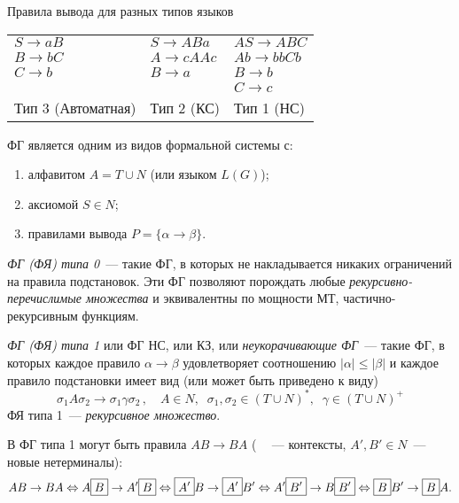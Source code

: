 \begin{ex}
  Правила вывода для разных типов языков
  \begin{center}
    \begin{tabular}[!hp]{p{11em}p{11em}p{8em}}
      $S \to aB$ & $S \to ABa$  & $AS \to ABC$ \\
      $B \to bC$ & $A \to cAAc$ & $Ab \to bbCb$\\
      $C \to b$  & $B \to a$    & $B  \to b$   \\
                 &              & $C  \to c$   \\[.5em]
      Тип 3 (Автоматная) & Тип 2 (КС) & Тип 1 (НС)\\
    \end{tabular}
  \end{center}
\end{ex}

\begin{rem}
  ФГ является одним из видов формальной системы с:
  \begin{enumerate}
  \item алфавитом $A = T \cup N$ (или языком $L(G)$);
  \item аксиомой $S \in N$;
  \item правилами вывода $P = \{\alpha \to \beta\}$.
  \end{enumerate}
\end{rem}

\begin{defin}
  \emph{ФГ (ФЯ) типа 0}~--- такие ФГ, в которых не накладывается
  никаких ограничений на правила подстановок. Эти ФГ позволяют
  порождать любые \emph{рекурсивно-перечислимые множества} и
  эквивалентны по мощности МТ, частично-рекурсивным функциям.
\end{defin}

\begin{defin}
  \emph{ФГ (ФЯ) типа 1} или ФГ НС, или КЗ, или \emph{неукорачивающие
    ФГ}~--- такие ФГ, в которых каждое правило $\alpha \to \beta$
  удовлетворяет соотношению $|\alpha| \leqslant |\beta|$ и каждое
  правило подстановки имеет вид (или может быть приведено к виду)
  \begin{equation*}
    \sigma_1 A \sigma_2 \to \sigma_1 \gamma \sigma_2\,,\quad A \in N,\;\;
    \sigma_1,\sigma_2 \in (T \cup N)^*,\;\; \gamma \in (T \cup N)^+
  \end{equation*}
  ФЯ типа 1~--- \emph{рекурсивное множество}.
\end{defin}

\begin{rem}
  В ФГ типа 1 могут быть правила $AB \to BA$
  ($\boxed{\phantom{A}}$~--- контексты, ${A',B' \in N}$~--- новые
  нетерминалы):
  \begin{equation*}
    AB \to BA \Leftrightarrow A\boxed{B} \to A'\boxed{B}
    \Leftrightarrow \boxed{A'}B \to \boxed{A'}B' \Leftrightarrow
    A'\boxed{B'} \to B\boxed{B'} \Leftrightarrow \boxed{B}B' \to
    \boxed{B}A\ldotp
  \end{equation*}

\end{rem}


